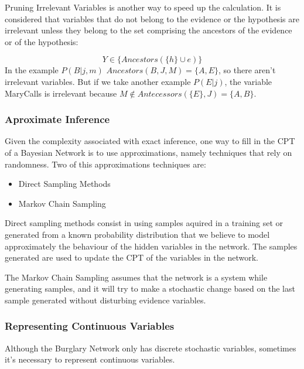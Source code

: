 Pruning Irrelevant Variables is another way to speed up the calculation. It is considered that variables that do not belong to the evidence or the hypothesis are irrelevant unless they belong to the set comprising the ancestors of the evidence or of the hypothesis:

\begin{equation}
\label{eq:irrelevance}
Y\in\{Ancestors(\{h\}\cup e)\}
\end{equation}
In the example $P(B\vert j,m)$ $Ancestors( {B}, J, M ) = \{ A, E\}$, so there aren't irrelevant variables.
But if we take another example $P(E\vert j)$, the variable MaryCalls is irrelevant because $M \notin Antecessors( \{E\}, J ) = \{ A, B\}$.

\subsubsection{Aproximate Inference}

Given the complexity associated with exact inference, one way to fill in the \ac{CPT} of a Bayesian Network is to use approximations, namely techniques that rely on randomness. Two of this approximations techniques are:
\begin{itemize}
\item Direct Sampling Methods
\item Markov Chain Sampling
\end{itemize}

Direct sampling methods consist in using samples aquired in a training set or generated from a known probability distribution that we believe to model approximately the behaviour of the hidden variables in the network. The samples generated are used to update the \ac{CPT} of the variables in the network.

The Markov Chain Sampling assumes that the network is a system while generating samples, and it will try to make a stochastic change based on the last sample generated without disturbing evidence variables.

\subsubsection{Representing Continuous Variables}
Although the Burglary Network only has discrete stochastic variables, sometimes it's necessary to represent continuous variables.

